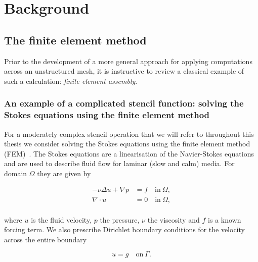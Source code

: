 \documentclass[thesis]{subfiles}
\begin{document}
\chapter{Background}
\label{chapter:background}


\section{The finite element method}

Prior to the development of a more general approach for applying computations across an unstructured mesh, it is instructive to review a classical example of such a calculation: \textit{finite element assembly}.

\subsection{An example of a complicated stencil function: solving the Stokes equations using the finite element method}

For a moderately complex stencil operation that we will refer to throughout this thesis we consider solving the Stokes equations using the finite element method (FEM)~\parencite{larsonFiniteElementMethod2013}.
The Stokes equations are a linearisation of the Navier-Stokes equations and are used to describe fluid flow for laminar (slow and calm) media.
For domain $\Omega$ they are given by

\begin{align}
  \label{strong_stokes_equation}
  - \nu \Delta u + \nabla p &= f \quad \textrm{in} \ \Omega, \\
  \nabla \cdot u &= 0 \quad \textrm{in} \ \Omega, \\
\end{align}

where $u$ is the fluid velocity, $p$ the pressure, $\nu$ the viscosity and $f$ is a known forcing term.
We also prescribe Dirichlet boundary conditions for the velocity across the entire boundary

\begin{equation}
  \label{strong_stokes_equation_bc}
  u = g \quad \textrm{on} \ \Gamma. 
\end{equation}
\end{document}
